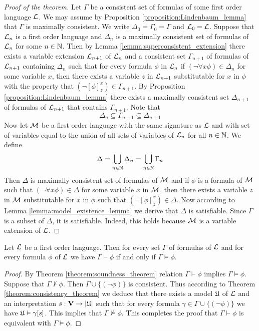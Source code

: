 \documentclass[10pt]{amsart}
\begin{document}
\begin{proof}[Proof of the theorem]
	Let $\Gamma$ be a consistent set of formulas of some first order language ${\mathcal L}$. We may assume by Proposition \ref{proposition:Lindenbaum_lemma} that $\Gamma$ is maximally consistent. We write $\Delta_0 = \Gamma_0 = \Gamma$ and ${\mathcal L}_0 = {\mathcal L}$. Suppose that ${\mathcal L}_n$ is a first order language and $\Delta_n$ is a maximally consistent set of formulas of ${\mathcal L}_n$ for some $n\in {\mathbb N}$. Then by Lemma \ref{lemma:superconsistent_extension} there exists a variable extension ${\mathcal L}_{n+1}$ of ${\mathcal L}_n$ and a consistent set $\Gamma_{n+1}$ of formulas of ${\mathcal L}_{n+1}$ containing $\Delta_n$ such that for every formula $\phi$ in ${\mathcal L}_n$ if $(\neg\forall x\phi) \in \Delta_n$ for some variable $x$, then there exists a variable $z$ in ${\mathcal L}_{n+1}$ substitutable for $x$ in $\phi$ with the property that $(\neg[\phi]^x_z) \in \Gamma_{n+1}$. By Proposition \ref{proposition:Lindenbaum_lemma} there exists a maximally consistent set $\Delta_{n+1}$ of formulas of ${\mathcal L}_{n+1}$ that contains $\Gamma_{n+1}$. Note that
	$$\Delta_n \subseteq \Gamma_{n+1} \subseteq \Delta_{n+1}$$
	Now let ${\mathcal M}$ be a first order language with the same signature as ${\mathcal L}$ and with set of variables equal to the union of all sets of variables of ${\mathcal L}_n$ for all $n\in {\mathbb N}$. We define
	$$\Delta = \bigcup_{n\in {\mathbb N}} \Delta_n = \bigcup_{n\in {\mathbb N}} \Gamma_n$$
	Then $\Delta$ is maximally consistent set of formulas of ${\mathcal M}$ and if $\phi$ is a formula of ${\mathcal M}$ such that $(\neg\forall x\phi) \in
		\Delta$ for some variable $x$ in ${\mathcal M}$, then there exists a variable $z$ in ${\mathcal M}$ substitutable for $x$ in $\phi$ such that $(\neg[\phi]^x_z) \in \Delta$. Now according to Lemma \ref{lemma:model_existence_lemma} we derive that $\Delta$ is satisfiable. Since $\Gamma$ is a subset of $\Delta$, it is satisfiable. Indeed, this holds because ${\mathcal M}$ is a variable extension of ${\mathcal L}$.
\end{proof}

\begin{corollary}\label{corollary:Gödels_completeness_theorem}
	Let ${\mathcal L}$ be a first order language. Then for every set $\Gamma$ of formulas of ${\mathcal L}$ and for every formula $\phi$ of ${\mathcal L}$ we have $\Gamma \vdash \phi$ if and only if $\Gamma \vDash \phi$.
\end{corollary}
\begin{proof}
	By Theorem \ref{theorem:soundness_theorem} relation $\Gamma \vdash \phi$ implies $\Gamma \vDash \phi$. Suppose that $\Gamma \nvdash \phi$. Then $\Gamma\cup \{(\neg \phi)\}$ is consistent. Thus according to Theorem \ref{theorem:consistency_theorem} we deduce that there exists a model ${\mathfrak U}$ of ${\mathcal L}$ and an interpretation $s:\mathbf{V}\rightarrow |{\mathfrak U}|$ such that for every formula $\gamma \in \Gamma \cup \{(\neg \phi)\}$ we have ${\mathfrak U} \vDash \gamma[s]$. This implies that $\Gamma \nvDash \phi$. This completes the proof that $\Gamma \vdash \phi$ is equivalent with $\Gamma \vDash \phi$.
\end{proof}
\end{document}
